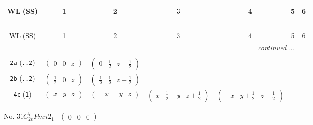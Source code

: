 \documentclass[fleqn,9pt,landscape]{jsarticle}
\begin{document}
\begin{center}
\renewcommand{\arraystretch}{1.2}
\begin{longtable}{ccccccc}
 \hline \hline
WL (SS) & 1 & 2 & 3 & 4 & 5 & 6 \\ \hline \endfirsthead

\multicolumn{6}{l}{\tablename\ \thetable{}} \\
 \hline \hline
WL (SS) & 1 & 2 & 3 & 4 & 5 & 6 \\ \hline \endhead

 \hline \hline
\multicolumn{6}{r}{\footnotesize\it continued ...} \\ \endfoot

 \hline \hline
\multicolumn{6}{r}{} \\ \endlastfoot

{\tt 2a} ({\tt ..2}) & $ \begin{pmatrix} 0 & 0 & z \end{pmatrix} $ & $ \begin{pmatrix} 0 & \frac{1}{2} & z + \frac{1}{2} \end{pmatrix} $ & $  $ & $  $ \\ \hline
{\tt 2b} ({\tt ..2}) & $ \begin{pmatrix} \frac{1}{2} & 0 & z \end{pmatrix} $ & $ \begin{pmatrix} \frac{1}{2} & \frac{1}{2} & z + \frac{1}{2} \end{pmatrix} $ & $  $ & $  $ \\ \hline
{\tt 4c} ({\tt 1}) & $ \begin{pmatrix} x & y & z \end{pmatrix} $ & $ \begin{pmatrix} - x & - y & z \end{pmatrix} $ & $ \begin{pmatrix} x & \frac{1}{2} - y & z + \frac{1}{2} \end{pmatrix} $ & $ \begin{pmatrix} - x & y + \frac{1}{2} & z + \frac{1}{2} \end{pmatrix} $ \\
\end{longtable}
\end{center}
\newpage
No. 31\quad$C_{2v}^{7}$\quad$Pmn2_1$\quad[ orthorhombic ]\quad$+\begin{pmatrix} 0 & 0 & 0 \end{pmatrix}$
\end{document}

